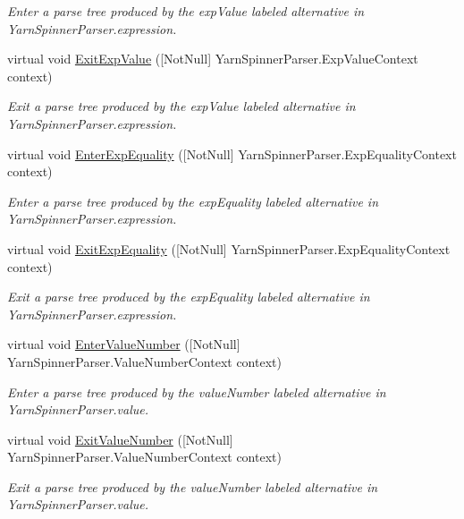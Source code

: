 \begin{DoxyCompactItemize}
\begin{DoxyCompactList}\small\item\em Enter a parse tree produced by the {\ttfamily exp\-Value} labeled alternative in Yarn\-Spinner\-Parser.\-expression. \end{DoxyCompactList}\item 
virtual void \hyperlink{a00190_a721acce8447553c78f8603381a30295f}{Exit\-Exp\-Value} (\mbox{[}Not\-Null\mbox{]} Yarn\-Spinner\-Parser.\-Exp\-Value\-Context context)
\begin{DoxyCompactList}\small\item\em Exit a parse tree produced by the {\ttfamily exp\-Value} labeled alternative in Yarn\-Spinner\-Parser.\-expression. \end{DoxyCompactList}\item 
virtual void \hyperlink{a00190_a56be9d851c42ae93e2f47e5f8a5d7677}{Enter\-Exp\-Equality} (\mbox{[}Not\-Null\mbox{]} Yarn\-Spinner\-Parser.\-Exp\-Equality\-Context context)
\begin{DoxyCompactList}\small\item\em Enter a parse tree produced by the {\ttfamily exp\-Equality} labeled alternative in Yarn\-Spinner\-Parser.\-expression. \end{DoxyCompactList}\item 
virtual void \hyperlink{a00190_a95e59996fc8cf316f487c99084228cae}{Exit\-Exp\-Equality} (\mbox{[}Not\-Null\mbox{]} Yarn\-Spinner\-Parser.\-Exp\-Equality\-Context context)
\begin{DoxyCompactList}\small\item\em Exit a parse tree produced by the {\ttfamily exp\-Equality} labeled alternative in Yarn\-Spinner\-Parser.\-expression. \end{DoxyCompactList}\item 
virtual void \hyperlink{a00190_afdedf143e349fc3d45837f63bfecc1c8}{Enter\-Value\-Number} (\mbox{[}Not\-Null\mbox{]} Yarn\-Spinner\-Parser.\-Value\-Number\-Context context)
\begin{DoxyCompactList}\small\item\em Enter a parse tree produced by the {\ttfamily value\-Number} labeled alternative in Yarn\-Spinner\-Parser.\-value. \end{DoxyCompactList}\item 
virtual void \hyperlink{a00190_aca49c7a82494d35e3c0035dc2d7f5b02}{Exit\-Value\-Number} (\mbox{[}Not\-Null\mbox{]} Yarn\-Spinner\-Parser.\-Value\-Number\-Context context)
\begin{DoxyCompactList}\small\item\em Exit a parse tree produced by the {\ttfamily value\-Number} labeled alternative in Yarn\-Spinner\-Parser.\-value. \end{DoxyCompactList}\item 

\end{DoxyCompactItemize}
